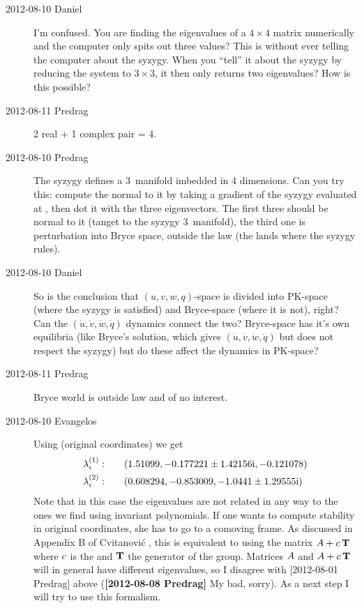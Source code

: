 \begin{description}
\item[2012-08-10 Daniel] I'm confused. You are finding the eigenvalues
of a $4 \times 4$ matrix numerically and the computer only spits out three values?
This is without ever telling the computer about the syzygy. When you
``tell'' it about the syzygy by reducing the system to $3 \times 3$, it
then only returns two eigenvalues? How is this possible?

\item[2012-08-11 Predrag] 2 real + 1 complex pair = 4.

\item[2012-08-10 Predrag] The syzygy defines a 3\dmn\ manifold imbedded
in 4 dimensions. Can you try this: compute the normal to it by taking a
gradient of the syzygy evaluated at , then dot it with the
three eigenvectors. The first three should be normal to it (tanget to the
syzygy 3\dmn\ manifold), the third one is perturbation into Bryce space,
outside the law (the lands where the syzygy rules).

\item[2012-08-10 Daniel] So is the conclusion that $(u,v,w,q)$-space is
divided into PK-space (where the syzygy is satisfied) and Bryce-space
(where it is not), right? Can the $(\dot{u},\dot{v},\dot{w},\dot{q})$ dynamics
connect the two? Bryce-space has it's own equilibria (like Bryce's solution, which
gives $(\dot{u},\dot{v},\dot{w},\dot{q})$ but does not respect the syzygy)
but do these affect the dynamics in PK-space?

\item[2012-08-11 Predrag] Bryce world is outside law and of no interest.

\item[2012-08-10 Evangelos]
Using  (original coordinates) we get
\begin{align}
  \lambda^{(1)}_i:\qquad  & (1.51099, -0.177221 \pm 1.42156 \mathrm{i}, -0.121078)\\
  \lambda^{(2)}_i:\qquad  & (0.608294, -0.853009, -1.0441 \pm  1.29555 \mathrm{i})
\end{align}
Note that in this case the eigenvalues are not related in any way to the
ones we find using invariant polynomials. If one wants to compute
stability in original coordinates, she has to go to a comoving frame. As
discussed in Appendix B of Cvitanovi\'c \etal{}, this is
equivalent to using the matrix $A+c\, \mathbf{T}$ where $c$ is
the {\phaseVel} and $\mathbf{T}$ the generator of the group. Matrices $A$ and
$A+c\, \mathbf{T}$ will in general have different eigenvalues, so I
disagree with [2012-08-01 Predrag] above
({\bf [2012-08-08 Predrag]} My bad, sorry).
As a next step I will try to use this formalism.


\end{description}
